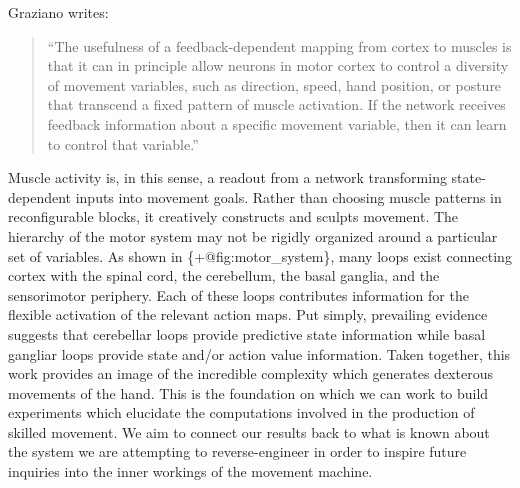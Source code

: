 Graziano writes:

\begin{quote}
``The usefulness of a feedback-dependent mapping from cortex to muscles
is that it can in principle allow neurons in motor cortex to control a
diversity of movement variables, such as direction, speed, hand
position, or posture that transcend a fixed pattern of muscle
activation. If the network receives feedback information about a
specific movement variable, then it can learn to control that
variable.''
\end{quote}

Muscle activity is, in this sense, a readout from a network transforming
state-dependent inputs into movement goals. Rather than choosing muscle
patterns in reconfigurable blocks, it creatively constructs and sculpts
movement. The hierarchy of the motor system may not be rigidly organized
around a particular set of variables. As shown in
\{+@fig:motor\_system\}, many loops exist connecting cortex with the
spinal cord, the cerebellum, the basal ganglia, and the sensorimotor
periphery. Each of these loops contributes information for the flexible
activation of the relevant action maps. Put simply, prevailing evidence
suggests that cerebellar loops provide predictive state information
while basal gangliar loops provide state and/or action value
information. Taken together, this work provides an image of the
incredible complexity which generates dexterous movements of the hand.
This is the foundation on which we can work to build experiments which
elucidate the computations involved in the production of skilled
movement. We aim to connect our results back to what is known about the
system we are attempting to reverse-engineer in order to inspire future
inquiries into the inner workings of the movement machine.


